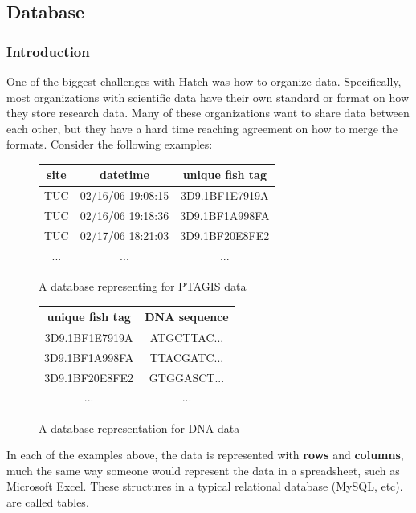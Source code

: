 \subsection{Database}

\subsubsection{Introduction}
One of the biggest challenges with Hatch was how to organize data. Specifically,
most organizations with scientific data have their own standard or format on 
how they store research data. Many of these organizations want to share data between 
each other, but they have a hard time reaching agreement on how to merge the formats.
Consider the following examples:

\begin{figure}[h]
	\begin{center}
	\begin{tabular}{ | c | c | c | }
		\hline
		site	&	datetime		&	unique fish tag	\\
		\hline
		TUC	&	02/16/06 19:08:15 	&	3D9.1BF1E7919A 	\\
		TUC	&	02/16/06 19:18:36 	&	3D9.1BF1A998FA 	\\
		TUC	&	02/17/06 18:21:03 	&	3D9.1BF20E8FE2	\\
		...	&	...			&	...		\\
		\hline
	\end{tabular}
	\caption{A database representing for PTAGIS data} 
	\label{ptagis_ex1}
	\end{center}
\end{figure}

\begin{figure}[h]
	\begin{center}
	\begin{tabular}{ | c | c | }
		\hline
		unique fish tag	&	DNA sequence	\\
		\hline
		3D9.1BF1E7919A 	&	ATGCTTAC...	\\
		3D9.1BF1A998FA 	&	TTACGATC...	\\
		3D9.1BF20E8FE2	&	GTGGASCT...	\\
		...		&	...		\\
		\hline
	\end{tabular}
	\caption{A database representation for DNA data} 
	\label{dna_ex1}
	\end{center}
\end{figure}

In each of the examples above, the data is represented with \textbf{rows} and
\textbf{columns}, much the same way someone would represent the data in a
spreadsheet, such as Microsoft Excel. These structures in a typical
relational database (MySQL, etc).  are called tables.

